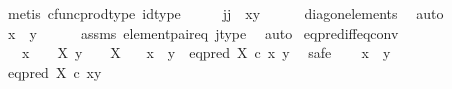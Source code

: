 \begin{isabellebody}
\ {\isacharparenleft}{\kern0pt}metis\ cfunc{\isacharunderscore}{\kern0pt}prod{\isacharunderscore}{\kern0pt}type\ id{\isacharunderscore}{\kern0pt}type{\isacharparenright}{\kern0pt}\isanewline
\ \ \isamarkupfalse%
\ \isamarkupfalse%
\ {\isachardoublequoteopen}{\isasymlangle}j{\isacharcomma}{\kern0pt}j{\isasymrangle}\ {\isacharequal}{\kern0pt}\ {\isasymlangle}x{\isacharcomma}{\kern0pt}y{\isasymrangle}{\isachardoublequoteclose}\isanewline
\ \ \ \ \isamarkupfalse%
\ diag{\isacharunderscore}{\kern0pt}on{\isacharunderscore}{\kern0pt}elements\ \isamarkupfalse%
\ auto\isanewline
\ \ \isamarkupfalse%
\ \isamarkupfalse%
\ {\isachardoublequoteopen}x\ {\isacharequal}{\kern0pt}\ y{\isachardoublequoteclose}\isanewline
\ \ \ \ \isamarkupfalse%
\ assms\ element{\isacharunderscore}{\kern0pt}pair{\isacharunderscore}{\kern0pt}eq\ j{\isacharunderscore}{\kern0pt}type\ \isamarkupfalse%
\ auto\isanewline
{}\isamarkupfalse%
%
\endisatagproof
{\isafoldproof}%
%
\isadelimproof
\isanewline
%
\endisadelimproof
\isanewline
{}\isamarkupfalse%
\ eq{\isacharunderscore}{\kern0pt}pred{\isacharunderscore}{\kern0pt}iff{\isacharunderscore}{\kern0pt}eq{\isacharunderscore}{\kern0pt}conv{\isacharcolon}{\kern0pt}\isanewline
\ \ \ {\isachardoublequoteopen}x\ {\isacharcolon}{\kern0pt}\ {\isasymone}\ {\isasymrightarrow}\ X{\isachardoublequoteclose}\ {\isachardoublequoteopen}y\ {\isacharcolon}{\kern0pt}\ {\isasymone}\ {\isasymrightarrow}\ X{\isachardoublequoteclose}\isanewline
\ \ \ {\isachardoublequoteopen}{\isacharparenleft}{\kern0pt}x\ {\isasymnoteq}\ y{\isacharparenright}{\kern0pt}\ {\isacharequal}{\kern0pt}\ {\isacharparenleft}{\kern0pt}eq{\isacharunderscore}{\kern0pt}pred\ X\ {\isasymcirc}\isactrlsub c\ {\isasymlangle}x{\isacharcomma}{\kern0pt}\ y{\isasymrangle}\ {\isacharequal}{\kern0pt}\ {\isasymf}{\isacharparenright}{\kern0pt}{\isachardoublequoteclose}\isanewline
%
\isadelimproof
%
\endisadelimproof
%
\isatagproof
{}\isamarkupfalse%
{\isacharparenleft}{\kern0pt}safe{\isacharparenright}{\kern0pt}\isanewline
\ \ \isamarkupfalse%
\ {\isachardoublequoteopen}x\ {\isasymnoteq}\ y{\isachardoublequoteclose}\isanewline
\ \ \isamarkupfalse%
\ \isamarkupfalse%
\ {\isachardoublequoteopen}eq{\isacharunderscore}{\kern0pt}pred\ X\ {\isasymcirc}\isactrlsub c\ {\isasymlangle}x{\isacharcomma}{\kern0pt}y{\isasymrangle}\ {\isacharequal}{\kern0pt}\ {\isasymf}{\isachardoublequoteclose}\isanewline

\end{isabellebody}
